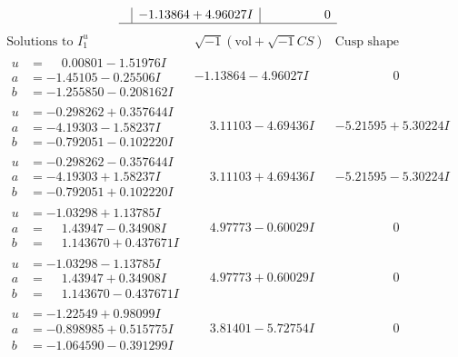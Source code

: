 \documentclass[1p]{elsarticle_modified}
\theoremstyle{definition}
\newcommand{\I}{\sqrt{-1}}
\begin{document}
$$\begin{array}{c|c|c}
 & -1.13864 + 4.96027 I & \phantom{-0.000000 } 0\\
 \hline 
 \end{array}$$\newpage$$\begin{array}{c|c|c}  
\text{Solutions to }I^u_{1}& \I (\text{vol} + \sqrt{-1}CS) & \text{Cusp shape}\\
 \hline 
\begin{aligned}
u &= \phantom{-}0.00801 - 1.51976 I \\
a &= -1.45105 - 0.25506 I \\
b &= -1.255850 - 0.208162 I\end{aligned}
 & -1.13864 - 4.96027 I & \phantom{-0.000000 } 0 \\ \hline\begin{aligned}
u &= -0.298262 + 0.357644 I \\
a &= -4.19303 - 1.58237 I \\
b &= -0.792051 - 0.102220 I\end{aligned}
 & \phantom{-}3.11103 - 4.69436 I & -5.21595 + 5.30224 I \\ \hline\begin{aligned}
u &= -0.298262 - 0.357644 I \\
a &= -4.19303 + 1.58237 I \\
b &= -0.792051 + 0.102220 I\end{aligned}
 & \phantom{-}3.11103 + 4.69436 I & -5.21595 - 5.30224 I \\ \hline\begin{aligned}
u &= -1.03298 + 1.13785 I \\
a &= \phantom{-}1.43947 - 0.34908 I \\
b &= \phantom{-}1.143670 + 0.437671 I\end{aligned}
 & \phantom{-}4.97773 - 0.60029 I & \phantom{-0.000000 } 0 \\ \hline\begin{aligned}
u &= -1.03298 - 1.13785 I \\
a &= \phantom{-}1.43947 + 0.34908 I \\
b &= \phantom{-}1.143670 - 0.437671 I\end{aligned}
 & \phantom{-}4.97773 + 0.60029 I & \phantom{-0.000000 } 0 \\ \hline\begin{aligned}
u &= -1.22549 + 0.98099 I \\
a &= -0.898985 + 0.515775 I \\
b &= -1.064590 - 0.391299 I\end{aligned}
 & \phantom{-}3.81401 - 5.72754 I & \phantom{-0.000000 } 0 \\ \hline\begin{aligned}

\end{aligned}
\end{array}$$
\end{document}

